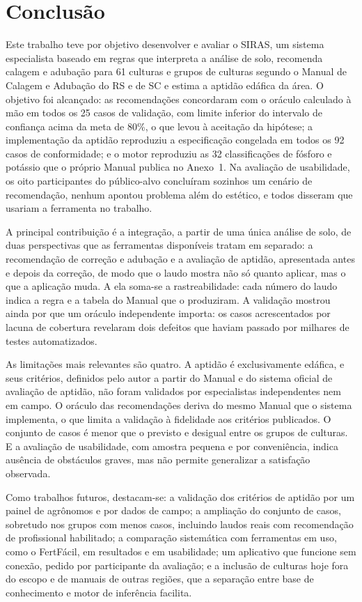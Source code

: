 \section{Conclusão}\label{sec:conclusao}

Este trabalho teve por objetivo desenvolver e avaliar o SIRAS, um sistema especialista baseado em
regras que interpreta a análise de solo, recomenda calagem e adubação para 61 culturas e grupos de
culturas segundo o Manual de Calagem e Adubação do RS e de SC e estima a aptidão edáfica da área.
O objetivo foi alcançado: as recomendações concordaram com o oráculo calculado à mão em todos os
25 casos de validação, com limite inferior do intervalo de confiança acima da meta de 80\%, o que
levou à aceitação da hipótese; a implementação da aptidão reproduziu a especificação congelada em
todos os 92 casos de conformidade; e o motor reproduziu as 32 classificações de fósforo e potássio
que o próprio Manual publica no Anexo~1.
Na avaliação de usabilidade, os oito participantes do público-alvo concluíram sozinhos um
cenário de recomendação, nenhum apontou problema além do estético, e todos disseram que usariam a
ferramenta no trabalho.

A principal contribuição é a integração, a partir de uma única análise de solo, de duas
perspectivas que as ferramentas disponíveis tratam em separado: a recomendação de correção e
adubação e a avaliação de aptidão, apresentada antes e depois da correção, de modo que o laudo
mostra não só quanto aplicar, mas o que a aplicação muda. A ela soma-se a rastreabilidade: cada
número do laudo indica a regra e a tabela do Manual que o produziram. A validação mostrou ainda
por que um oráculo independente importa: os casos acrescentados por lacuna de cobertura revelaram
dois defeitos que haviam passado por milhares de testes automatizados.

As limitações mais relevantes são quatro. A aptidão é exclusivamente edáfica, e seus critérios,
definidos pelo autor a partir do Manual e do sistema oficial de avaliação de aptidão, não foram
validados por especialistas independentes nem em campo. O oráculo das recomendações deriva do
mesmo Manual que o sistema implementa, o que limita a validação à fidelidade aos critérios
publicados. O conjunto de casos é menor que o previsto e desigual entre os grupos de culturas. E
a avaliação de usabilidade, com amostra pequena e por conveniência, indica ausência de obstáculos
graves, mas não permite generalizar a satisfação observada.

Como trabalhos futuros, destacam-se: a validação dos critérios de aptidão por um painel de
agrônomos e por dados de campo; a ampliação do conjunto de casos, sobretudo nos grupos com menos
casos, incluindo laudos reais com recomendação de profissional habilitado; a comparação sistemática
com ferramentas em uso, como o FertFácil, em resultados e em usabilidade; um aplicativo que
funcione sem conexão, pedido por participante da avaliação; e a inclusão de culturas hoje fora do
escopo e de manuais de outras regiões, que a separação entre base de conhecimento e motor de
inferência facilita.
